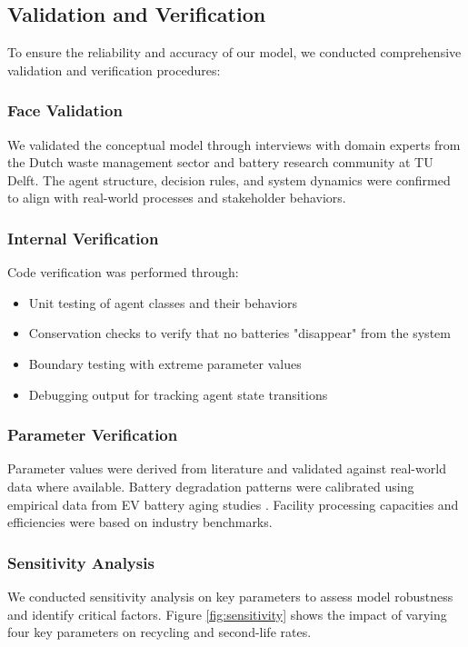\subsection{Validation and Verification}
To ensure the reliability and accuracy of our model, we conducted comprehensive validation and verification procedures:

\subsubsection{Face Validation}
We validated the conceptual model through interviews with domain experts from the Dutch waste management sector and battery research community at TU Delft. The agent structure, decision rules, and system dynamics were confirmed to align with real-world processes and stakeholder behaviors.

\subsubsection{Internal Verification}
Code verification was performed through:
\begin{itemize}
  \item Unit testing of agent classes and their behaviors
  \item Conservation checks to verify that no batteries "disappear" from the system
  \item Boundary testing with extreme parameter values
  \item Debugging output for tracking agent state transitions
\end{itemize}

\subsubsection{Parameter Verification}
Parameter values were derived from literature and validated against real-world data where available. Battery degradation patterns were calibrated using empirical data from EV battery aging studies \cite{Hu2017}. Facility processing capacities and efficiencies were based on industry benchmarks.

\subsubsection{Sensitivity Analysis}
We conducted sensitivity analysis on key parameters to assess model robustness and identify critical factors. Figure \ref{fig:sensitivity} shows the impact of varying four key parameters on recycling and second-life rates.

